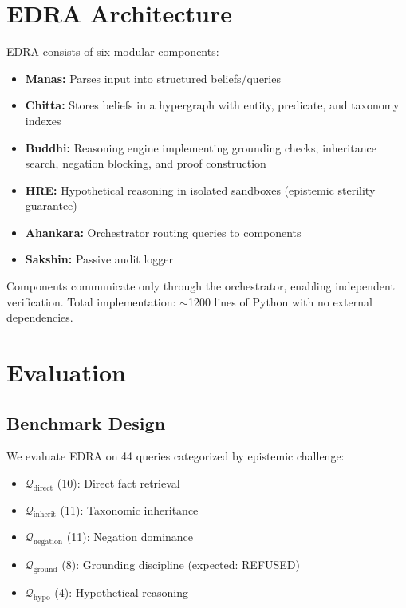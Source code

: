 \documentclass[11pt]{article}
\begin{document}
\section{EDRA Architecture}

EDRA consists of six modular components:

\begin{itemize}
    \item \textbf{Manas:} Parses input into structured beliefs/queries
    \item \textbf{Chitta:} Stores beliefs in a hypergraph with entity, predicate, and taxonomy indexes
    \item \textbf{Buddhi:} Reasoning engine implementing grounding checks, inheritance search, negation blocking, and proof construction
    \item \textbf{HRE:} Hypothetical reasoning in isolated sandboxes (epistemic sterility guarantee)
    \item \textbf{Ahankara:} Orchestrator routing queries to components
    \item \textbf{Sakshin:} Passive audit logger
\end{itemize}

Components communicate only through the orchestrator, enabling independent verification. Total implementation: $\sim$1200 lines of Python with no external dependencies.

\section{Evaluation}

\subsection{Benchmark Design}

We evaluate EDRA on 44 queries categorized by epistemic challenge:

\begin{itemize}
    \item $\mathcal{Q}_{\text{direct}}$ (10): Direct fact retrieval
    \item $\mathcal{Q}_{\text{inherit}}$ (11): Taxonomic inheritance
    \item $\mathcal{Q}_{\text{negation}}$ (11): Negation dominance
    \item $\mathcal{Q}_{\text{ground}}$ (8): Grounding discipline (expected: REFUSED)
    \item $\mathcal{Q}_{\text{hypo}}$ (4): Hypothetical reasoning
\end{itemize}
\end{document}
